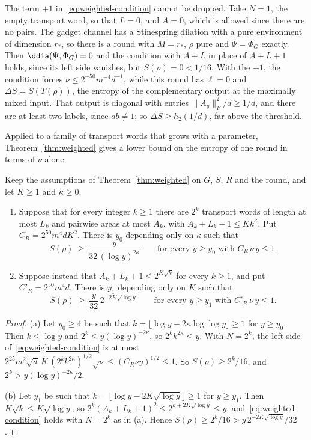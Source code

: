 \begin{remark}\label{rem:plus-one}
The term $+1$ in~\eqref{eq:weighted-condition} cannot be dropped. Take $N=1$, the empty transport word, so that $L=0$, and $A=0$, which is
allowed since there are no pairs. The gadget channel has a Stinespring dilation with a pure environment of dimension $r_*$, so there is a round
with $M=r_*$, $\rho$ pure and $\Psi=\Phi_G$ exactly. Then $\ddia(\Psi,\Phi_G)=0$ and the condition with $A+L$ in place of $A+L+1$ holds, since its left
side vanishes, but $S(\rho)=0<1/16$. With the $+1$, the condition forces $\nu\le2^{-50}m^{-4}d^{-1}$, while this round has $\ell=0$ and
$\Delta S=S(T(\rho))$, the entropy of the complementary output at the maximally mixed input. That output is diagonal with entries
$\|A_g\|_F^2/d\ge1/d$, and there are at least two labels, since $ab\ne1$; so $\Delta S\ge h_2(1/d)$, far above the threshold.
\end{remark}

Applied to a family of transport words that grows with a parameter, Theorem~\ref{thm:weighted} gives a lower bound on the entropy of one round
in terms of $\nu$ alone.

\begin{corollary}[Amplification]\label{cor:amplification}
Keep the assumptions of Theorem~\ref{thm:weighted} on $G$, $S$, $R$ and the round, and let $K\ge1$ and $\kappa\ge0$.
\begin{enumerate}[label=(\alph*),itemsep=1pt]
\item Suppose that for every integer $k\ge1$ there are $2^k$ transport words of length at most $L_k$ and pairwise areas at most $A_k$, with
$A_k+L_k+1\le Kk^\kappa$. Put $C_R=2^{50}m^4dK^2$. There is $y_0$ depending only on $\kappa$ such that
\[
S(\rho)\ \ge\ \frac{y}{32\,(\log y)^{2\kappa}}\qquad\text{for every }y\ge y_0\text{ with }C_R\,\nu\,y\le1 .
\]
\item Suppose instead that $A_k+L_k+1\le2^{K\sqrt k}$ for every $k\ge1$, and put $C'_R=2^{50}m^4d$. There is $y_1$ depending only on $K$ such that
\[
S(\rho)\ \ge\ \frac{y}{32}\,2^{-2K\sqrt{\log y}}\qquad\text{for every }y\ge y_1\text{ with }C'_R\,\nu\,y\le1 .
\]
\end{enumerate}
\end{corollary}

\begin{proof}
(a) Let $y_0\ge4$ be such that $k=\lfloor\log y-2\kappa\log\log y\rfloor\ge1$ for $y\ge y_0$. Then $k\le\log y$ and $2^k\le y(\log y)^{-2\kappa}$, so
$2^kk^{2\kappa}\le y$. With $N=2^k$, the left side of~\eqref{eq:weighted-condition} is at most
$2^{25}m^2\sqrt d\,K\,(2^kk^{2\kappa})^{1/2}\sqrt\nu\le(C_R\nu y)^{1/2}\le1$. So $S(\rho)\ge2^k/16$, and $2^k>y(\log y)^{-2\kappa}/2$.

(b) Let $y_1$ be such that $k=\lfloor\log y-2K\sqrt{\log y}\rfloor\ge1$ for $y\ge y_1$. Then $K\sqrt k\le K\sqrt{\log y}$, so
$2^k(A_k+L_k+1)^2\le2^{k+2K\sqrt{\log y}}\le y$, and~\eqref{eq:weighted-condition} holds with $N=2^k$ as in (a). Hence
$S(\rho)\ge2^k/16>y\,2^{-2K\sqrt{\log y}}/32$.
\end{proof}

